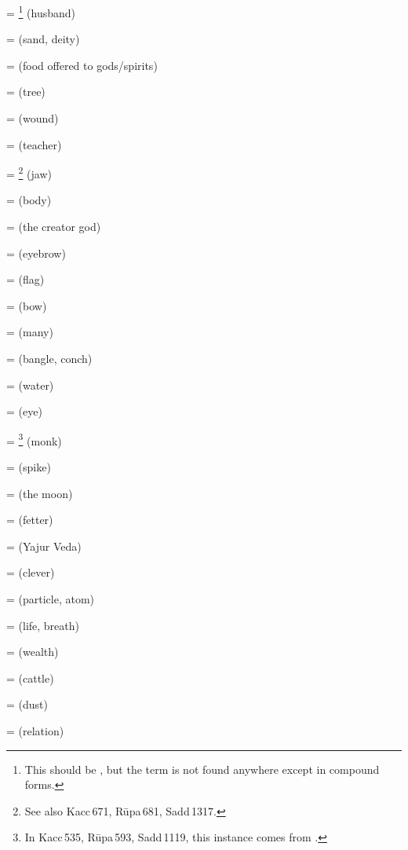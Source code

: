  = \footnote{ This should be , but the term is not found anywhere except in compound forms.} (husband)\par
{} =  (sand, deity)\par
{} =  (food offered to gods/spirits)\par
{} =  (tree)\par
{} =  (wound)\par
{} =  (teacher)\par
{} = \footnote{See also Kacc\,671, R\=upa\,681, Sadd\,1317.} (jaw)\par
{} =  (body)\par
{} =  (the creator god)\par
{} =  (eyebrow)\par
{} =  (flag)\par
{} =  (bow)\par
{} =  (many)\par
{} =  (bangle, conch)\par
{} =  (water)\par
{} =  (eye)\par
{} = \footnote{In Kacc\,535, R\=upa\,593, Sadd\,1119, this instance comes from .} (monk)\par
{} =  (spike)\par
{} =  (the moon)\par
{} =  (fetter)\par
{} =  (Yajur Veda)\par
{} =  (clever)\par
{} =  (particle, atom)\par
{} =  (life, breath)\par
{} =  (wealth)\par
{} =  (cattle)\par
{} =  (dust)\par
{} =  (relation)\par


